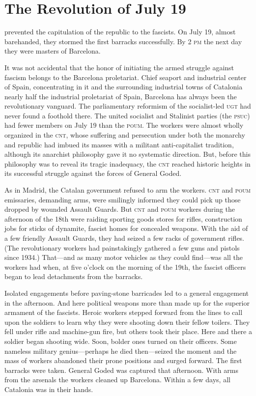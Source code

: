 \chapter{The Revolution of July 19}

 prevented the capitulation of the republic to the fascists. On July 19, almost barehanded, they stormed the first barracks successfully. By 2 \textsc{pm} the next day they were masters of Barcelona.

It was not accidental that the honor of initiating the armed struggle against fascism belongs to the Barcelona proletariat. Chief seaport and industrial center of Spain, concentrating in it and the surrounding industrial towns of Catalonia nearly half the industrial proletariat of Spain, Barcelona has always been the revolutionary vanguard. The parliamentary reformism of the socialist-led \textsc{ugt} had never found a foothold there. The united socialist and Stalinist parties (the \textsc{psuc}) had fewer members on July 19 than the \textsc{poum}. The workers were almost wholly organized in the \textsc{cnt}, whose suffering and persecution under both the monarchy and republic had imbued its masses with a militant anti-capitalist tradition, although its anarchist philosophy gave it no systematic direction. But, before this philosophy was to reveal its tragic inadequacy, the \textsc{cnt} reached historic heights in its successful struggle against the forces of General Goded.

As in Madrid, the Catalan government refused to arm the workers. \textsc{cnt} and \textsc{poum} emissaries, demanding arms, were smilingly informed they could pick up those dropped by wounded Assault Guards.
But \textsc{cnt} and \textsc{poum} workers during the afternoon of the 18th were raiding sporting goods stores for rifles, construction jobs for sticks of dynamite, fascist homes for concealed weapons. With the aid of a few friendly Assault Guards, they had seized a few racks of government rifles. (The revolutionary workers had painstakingly gathered a few guns and pistols since 1934.) That---and as many motor vehicles as they could find---was all the workers had when, at five o’clock on the morning of the 19th, the fascist officers began to lead detachments from the barracks.

Isolated engagements before paving-stone barricades led to a general engagement in the afternoon. And here political weapons more than made up for the superior armament of the fascists. Heroic workers stepped forward from the lines to call upon the soldiers to learn why they were shooting down their fellow toilers. They fell under rifle and machine-gun fire, but others took their place. Here and there a soldier began shooting wide. Soon, bolder ones turned on their officers. Some nameless military genius---perhaps he died then---seized the moment and the mass of workers abandoned their prone positions and surged forward. The first barracks were taken. General Goded was captured that afternoon. With arms from the arsenals the workers cleaned up Barcelona. Within a few days, all Catalonia was in their hands.

